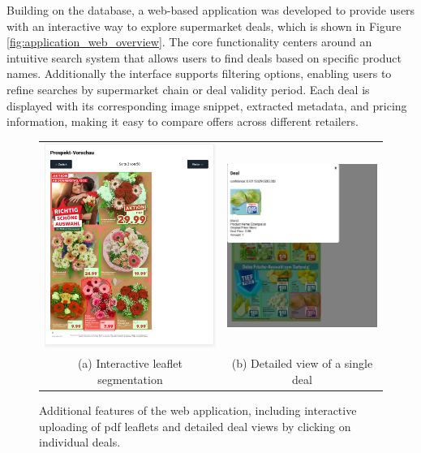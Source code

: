 \documentclass[11pt]{article}
\begin{document}
Building on the database, a web-based application was developed to provide users with an interactive way to explore supermarket deals, which is shown in Figure \ref{fig:application_web_overview}. The core functionality centers around an intuitive search system that allows users to find deals based on specific product names. Additionally the interface supports filtering options, enabling users to refine searches by supermarket chain or deal validity period. Each deal is displayed with its corresponding image snippet, extracted metadata, and pricing information, making it easy to compare offers across different retailers.

\begin{figure}[h!]
    \centering
    \begin{tabular}{cc}
    \includegraphics[width=0.45\linewidth]{figures/application/leaflet_segmentations.png} &   \includegraphics[width=0.45\linewidth]{figures/application/single_deal.png} \\
    (a) Interactive leaflet segmentation & (b) Detailed view of a single deal \\[2pt]
    \end{tabular}
    \caption{Additional features of the web application, including interactive uploading of pdf leaflets and detailed deal views by clicking on individual deals.}
    \label{fig:application_combined}
\end{figure}
\end{document}
